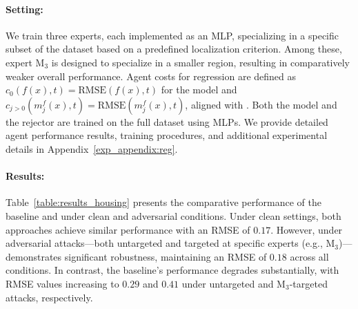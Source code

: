 \paragraph{Setting:} We train three experts, each implemented as an MLP, specializing in a specific subset of the dataset based on a predefined localization criterion. Among these, expert  M\(_3 \) is designed to specialize in a smaller region, resulting in comparatively weaker overall performance. Agent costs for regression are defined as \( c_0(f(x), t) = \text{RMSE}(f(x), t) \) for the model and \( c_{j > 0}(m_j^f(x), t) = \text{RMSE}(m_j^f(x), t) \), aligned with \citep{mao2024regressionmultiexpertdeferral}.  Both the model and the rejector are trained on the full dataset using MLPs. We provide detailed agent performance results, training procedures, and additional experimental details in Appendix~\ref{exp_appendix:reg}. 


\begin{table}[ht]\label{table:results_housing}
\centering{}
\caption{Performance comparison of \name{} with the baseline \citep{mao2024regressionmultiexpertdeferral} on the California Housing dataset. The table reports Root Mean Square Error (RMSE).}
\end{table}%
\paragraph{Results:} Table~\ref{table:results_housing} presents the comparative performance of the baseline and \name{} under clean and adversarial conditions. Under clean settings, both approaches achieve similar performance with an RMSE of \(0.17\). However, under adversarial attacks—both untargeted and targeted at specific experts (e.g., M\(_3\))—\name{} demonstrates significant robustness, maintaining an RMSE of \(0.18\) across all conditions. In contrast, the baseline's performance degrades substantially, with RMSE values increasing to \(0.29\) and \(0.41\) under untargeted and M\(_3\)-targeted attacks, respectively.


